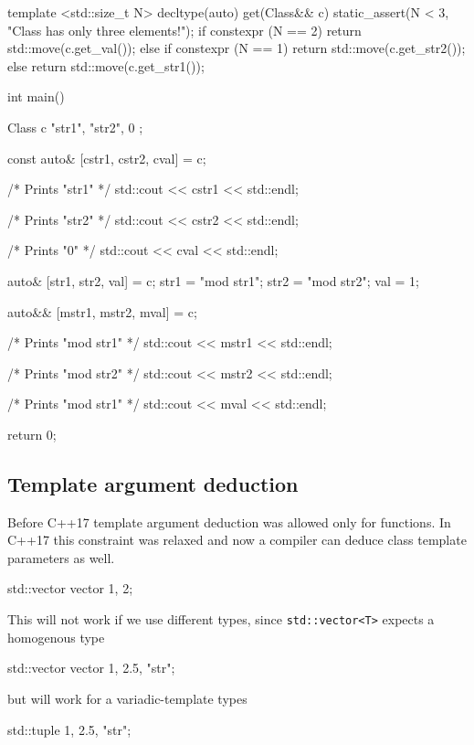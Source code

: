 \documentclass[../main]{subfiles}
\begin{document}
\begin{Code}
    template <std::size_t N>
    decltype(auto) get(Class&& c)
    {
        static_assert(N < 3, "Class has only three elements!");
        if constexpr (N == 2)
        {
            return std::move(c.get_val());
        }
        else if constexpr (N == 1)
        {
            return std::move(c.get_str2());
        }
        else
        {
            return std::move(c.get_str1());
        }
    }
    
    int main()
    {
        Class c { "str1", "str2", 0 };
        
        const auto& [cstr1, cstr2, cval] = c;
        
        /* Prints "str1" */
        std::cout << cstr1 << std::endl;
        
        /* Prints "str2" */
        std::cout << cstr2 << std::endl;
        
        /* Prints "0" */
        std::cout << cval << std::endl;
        
        auto& [str1, str2, val] = c;
        str1 = "mod str1";
        str2 = "mod str2";
        val = 1;
        
        auto&& [mstr1, mstr2, mval] = c;
        
        /* Prints "mod str1" */
        std::cout << mstr1 << std::endl;
        
        /* Prints "mod str2" */
        std::cout << mstr2 << std::endl;
        
        /* Prints "mod str1" */
        std::cout << mval << std::endl;
    
        return 0;
    }
\end{Code}

\subsection{Template argument deduction}
    Before C++17 template argument deduction was allowed only for functions. In C++17 this constraint was relaxed and now a compiler
can deduce class template parameters as well.
\begin{Code}
    std::vector vector {1, 2};
\end{Code}
\noindent
    This will not work if we use different types, since
\texttt{std::vector<T>} expects a homogenous type
\begin{Code}
    std::vector vector {1, 2.5, "str"};
\end{Code}
but will work for a variadic-template types
\begin{Code}
    std::tuple { 1, 2.5, "str"};
\end{Code}
\end{document}
